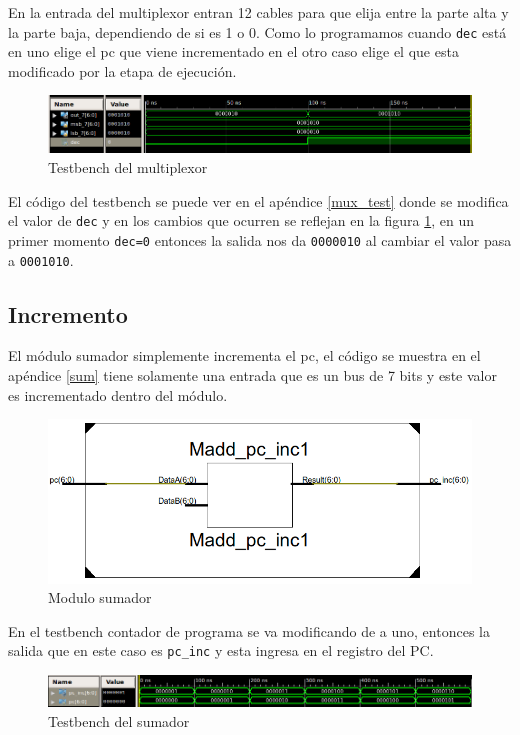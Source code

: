 En la entrada del multiplexor entran 12 cables para que elija entre la parte alta y la parte baja, dependiendo de si es 1 o 0. Como lo programamos cuando \texttt{dec} est\'a en uno elige el \ac{pc}  que viene incrementado en el otro caso elige el que esta modificado por la etapa de ejecución.

\begin{figure}[H]
\centering
\includegraphics[scale=0.4]{Capitulo01/mux_test}
\caption{Testbench del multiplexor}
\label{fig:muxt}
\end{figure}

El c\'odigo del testbench se puede ver en el apéndice \ref{mux_test} donde se modifica el valor de \texttt{dec} y en los cambios que ocurren se reflejan en la figura \ref{fig:muxt}, en un primer momento \texttt{dec=0} entonces la salida nos da \texttt{0000010} al cambiar el valor pasa a \texttt{0001010}.

\subsection{Incremento}
El m\'odulo sumador simplemente incrementa el \ac{pc}, el código se muestra en el apéndice \ref{sum}  tiene solamente una entrada que es un bus de 7 bits y este valor es incrementado dentro del m\'odulo. 


\begin{figure}[H]
\centering
\includegraphics[scale=0.45]{img/sumador_inside}
\caption{Modulo sumador}
\label{fig:sumador}
\end{figure}


En el testbench contador de programa se va modificando de a uno, entonces la salida que en este caso es \texttt{pc\_inc} y esta ingresa en el registro del \ac{PC}. 


\begin{figure}[H]
\centering
\includegraphics[scale=0.45]{Capitulo01/sum_test}
\caption{Testbench del sumador}
\label{fig:sumt}
\end{figure}


